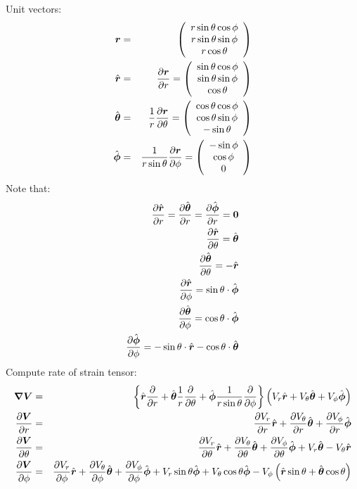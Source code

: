 \documentclass[11pt]{article}
\begin{document}
Unit vectors:
\begin{eqnarray}
 \br &=& \mat{c}{r\sin\theta \cos\phi \\ r\sin\theta \sin\phi \\ r\cos\theta} \\
 \brhat &=& \deriv{\br}{r}
 = \mat{c}{\sin\theta \cos\phi \\ \sin\theta \sin\phi \\ \cos\theta} \\
 \bthetahat &=& \frac{1}{r} \deriv{\br}{\theta}
 = \mat{c}{\cos\theta \cos\phi \\ \cos\theta \sin\phi \\ -\sin\theta} \\
 \bphihat &=& \frac{1}{r \sin \theta} \deriv{\br}{\phi}
 = \mat{c}{-\sin\phi \\ \cos\phi \\ 0}
\end{eqnarray}
Note that:
\begin{eqnarray}
  \deriv{\brhat}{r} = \deriv{\bthetahat}{r} = \deriv{\bphihat}{r} = \mathbf{0} \\
  \deriv{\brhat}{\theta} = \bthetahat \\
  \deriv{\bthetahat}{\theta} = -\brhat \\
  \deriv{\brhat}{\phi} = \sin \theta \cdot \bphihat \\
  \deriv{\bthetahat}{\phi} = \cos \theta \cdot \bphihat \\
  \deriv{\bphihat}{\phi} = -\sin \theta \cdot \brhat -\cos \theta \cdot \bthetahat
\end{eqnarray}
Compute rate of strain tensor:
\begin{eqnarray}
\bnabla\bV &=& \left\{ \brhat \deriv{}{r} +
\bthetahat \frac{1}{r} \deriv{}{\theta} +
\bphihat \frac{1}{r \sin\theta} \deriv{}{\phi} \right\}
\left( V_r \brhat + V_\theta \bthetahat + V_\phi \bphihat \right)
\\
\deriv{\bV}{r} &=&
\deriv{V_r}{r}\brhat + \deriv{V_\theta}{r}\bthetahat + \deriv{V_\phi}{r}\bphihat
\\
\deriv{\bV}{\theta} &=&
\deriv{V_r}{\theta}\brhat + \deriv{V_\theta}{\theta}\bthetahat + \deriv{V_\phi}{\theta}\bphihat
+ V_r\bthetahat - V_\theta\brhat
\\
\deriv{\bV}{\phi} &=&
\deriv{V_r}{\phi}\brhat + \deriv{V_\theta}{\phi}\bthetahat + \deriv{V_\phi}{\phi}\bphihat
+ V_r \sin\theta\bphihat + V_\theta \cos\theta\bphihat -
V_\phi \left(\brhat \sin\theta + \bthetahat \cos\theta \right)
\end{eqnarray}
\end{document}
